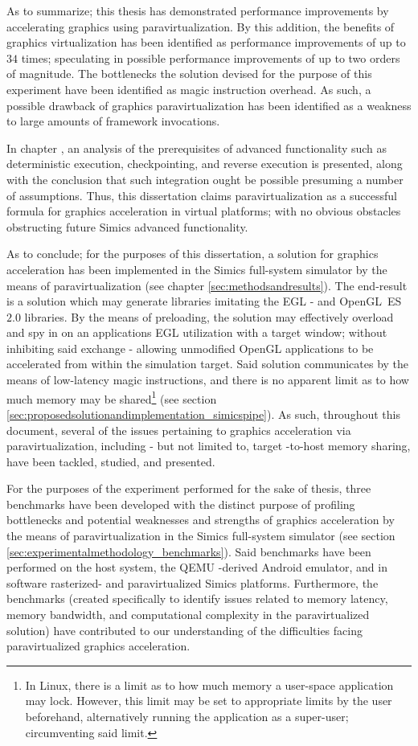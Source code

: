 As to summarize; this thesis has demonstrated performance improvements by accelerating graphics using paravirtualization.
By this addition, the benefits of graphics virtualization has been identified as performance improvements of up to $34$ times; speculating in possible performance improvements of up to two orders of magnitude.
The bottlenecks the solution devised for the purpose of this experiment have been identified as magic instruction overhead.
As such, a possible drawback of graphics paravirtualization has been identified as a weakness to large amounts of framework invocations.

In chapter , an analysis of the prerequisites of advanced functionality such as deterministic execution, checkpointing, and reverse execution is presented, along with the conclusion that such integration ought be possible presuming a number of assumptions.
Thus, this dissertation claims paravirtualization as a successful formula for graphics acceleration in virtual platforms; with no obvious obstacles obstructing future Simics advanced functionality.

As to conclude; for the purposes of this dissertation, a solution for graphics acceleration has been implemented in the Simics full-system simulator by the means of paravirtualization (see chapter \ref{sec:methodsandresults}).
The end-result is a solution which may generate libraries imitating the EGL - and OpenGL~ES~$2.0$ libraries.
By the means of preloading, the solution may effectively overload and spy in on an applications EGL utilization with a target window; without inhibiting said exchange - allowing unmodified OpenGL applications to be accelerated from within the simulation target.
Said solution communicates by the means of low-latency magic instructions, and there is no apparent limit as to how much memory may be shared\footnote{In Linux, there is a limit as to how much memory a user-space application may lock. However, this limit may be set to appropriate limits by the user beforehand, alternatively running the application as a super-user; circumventing said limit.} (see section \ref{sec:proposedsolutionandimplementation_simicspipe}).
As such, throughout this document, several of the issues pertaining to graphics acceleration via paravirtualization, including - but not limited to, target -to-host memory sharing, have been tackled, studied, and presented.

For the purposes of the experiment performed for the sake of thesis, three benchmarks have been developed with the distinct purpose of profiling bottlenecks and potential weaknesses and strengths of graphics acceleration by the means of paravirtualization in the Simics full-system simulator (see section \ref{sec:experimentalmethodology_benchmarks}).
Said benchmarks have been performed on the host system, the QEMU -derived Android emulator, and in software rasterized- and paravirtualized Simics platforms.
Furthermore, the benchmarks (created specifically to identify issues related to memory latency, memory bandwidth, and computational complexity in the paravirtualized solution) have contributed to our understanding of the difficulties facing paravirtualized graphics acceleration.

